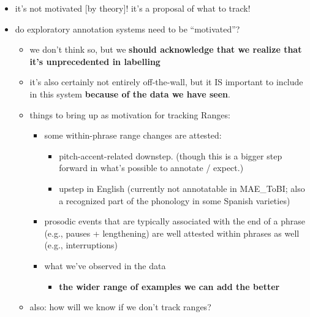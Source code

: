 \documentclass[11pt, twoside]{memoir}
\begin{document}
\begin{itemize}
  \begin{itemize}
  \tightlist
  \item
    it's not motivated {[}by theory{]}! it's a proposal of what to
    track!\\
  \item
    do exploratory annotation systems need to be ``motivated''?

    \begin{itemize}
    \tightlist
    \item
      we don't think so, but we \textbf{should acknowledge that we
      realize that it's unprecedented in labelling}\\
    \item
      it's also certainly not entirely off-the-wall, but it IS important
      to include in this system \textbf{because of the data we have
      seen}.\\
    \item
      things to bring up as motivation for tracking Ranges:

      \begin{itemize}
      \tightlist
      \item
        some within-phrase range changes are attested:

        \begin{itemize}
        \tightlist
        \item
          pitch-accent-related downstep. (though this is a bigger step
          forward in what's possible to annotate / expect.)\\
        \item
          upstep in English (currently not annotatable in MAE\_ToBI;
          also a recognized part of the phonology in some Spanish
          varieties)\\
        \end{itemize}
      \item
        prosodic events that are typically associated with the end of a
        phrase (e.g., pauses + lengthening) are well attested within
        phrases as well (e.g., interruptions)\\
      \item
        what we've observed in the data

        \begin{itemize}
        \tightlist
        \item
          \textbf{the wider range of examples we can add the better}\\
        \end{itemize}
      \end{itemize}
    \item
      also: how will we know if we don't track ranges?


\end{itemize}
\end{itemize}
\end{itemize}
\end{document}
